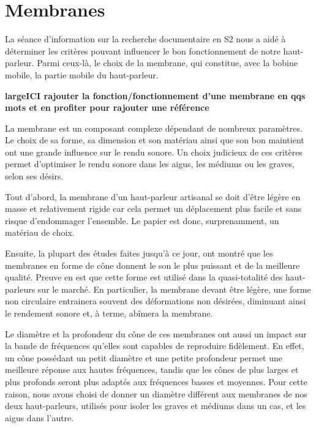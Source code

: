 \section{Membranes}

La séance d’information sur la recherche documentaire en S2
nous a aidé à déterminer les critères pouvant influencer
le bon fonctionnement de notre haut-parleur.
Parmi ceux-là, le choix de la membrane, qui constitue, avec la bobine mobile, la partie mobile
du haut-parleur.


\textbf{large{ICI rajouter la fonction/fonctionnement d'une membrane en qqs mots} et en profiter pour rajouter une référence}


La membrane est un composant complexe dépendant de nombreux paramètres. Le choix de sa forme, sa dimension et son matériau ainsi que son bon maintient ont une grande influence sur le rendu sonore. Un choix judicieux de ces critères permet d'optimiser le rendu sonore dans les aigus, les médiums ou les graves, selon ses désirs.

Tout d’abord, la membrane d’un haut-parleur artisanal
se doit d’être légère en masse et relativement rigide
car cela permet un déplacement plus facile et
sans risque d’endommager l’ensemble.
Le papier est donc, surprenamment, un matériau de choix.

Ensuite, la plupart des études faites jusqu’à ce jour,
ont montré que les membranes en forme de cône
donnent le son le plus puissant et de la meilleure qualité.
Preuve en est que cette forme est utilisé dans la quasi-totalité
des haut-parleurs sur le marché.
En particulier, la membrane devant être légère,
une forme non circulaire entrainera souvent des déformations non désirées,
diminuant ainsi le rendement sonore et, à terme, abîmera la membrane.

Le diamètre et la profondeur du cône de ces membranes
ont aussi un impact sur la bande de fréquences
qu’elles sont capables de reproduire fidèlement.
En effet, un cône possédant un petit diamètre et une petite profondeur
permet une meilleure réponse aux hautes fréquences,
tandis que les cônes de plus larges et plus profonds
seront plus adaptés aux fréquences basses et moyennes.
Pour cette raison, nous avons choisi de donner un diamètre
différent aux membranes de nos deux haut-parleurs,
utilisés pour isoler les graves et médiums dans un cas,
et les aigus dans l'autre.

